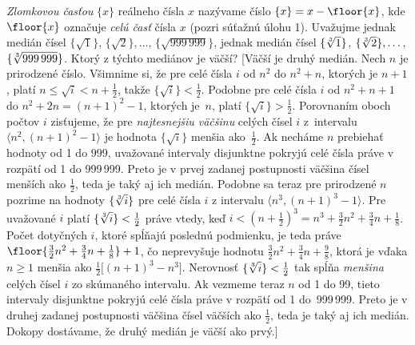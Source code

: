 {\leavevmode\emph{Zlomkovou časťou} $\{x\}$ reálneho čísla $x$ nazývame
číslo $\{x\} = x - \floor{x}$, kde $\floor{x}$ označuje {\it celú
časť\/} čísla $x$ (pozri súťažnú úlohu 1). Uvažujme jednak medián
čísel $\{\sqrt{1}\}$, $\{\sqrt{2}\}, \dots$, $\{\sqrt{999\,999}\}$,
jednak medián čísel $\{\root3\of{1}\}$, $\{\root3\of{2}\}, \dots$,
$\{\root3\of{999\,999}\}$. Ktorý z týchto mediánov je väčší?
[Väčší je druhý medián. Nech $n$ je prirodzené číslo. Všimnime si,
že pre celé čísla $i$ od $n^2$ do $n^2+n$, ktorých je $n+1$, platí
$n\leq\sqrt{i}<n+\frac12$, takže $\{\sqrt{i}\}<\frac12$.
Podobne pre celé čísla $i$ od $n^2+n+1$ do $n^2+2n=(n+1)^2-1$, ktorých
je~$n$, platí $\{\sqrt{i}\}>\frac12$. Porovnaním oboch počtov $i$
zisťujeme, že pre {\it najtesnejšiu väčšinu} celých čísel
$i$ z~intervalu $\langle n^2, (n+1)^2-1 \rangle$ je
hodnota $\{\sqrt{i}\}$ menšia ako~$\frac12$. Ak necháme $n$
prebiehať hodnoty od 1 do 999, uvažované intervaly disjunktne
pokryjú celé čísla práve v rozpätí od 1 do 999\,999.
Preto je v prvej zadanej postupnosti väčšina čísel
menších ako $\frac12$, teda je taký aj ich medián. Podobne
sa teraz pre prirodzené $n$ pozrime na hodnoty $\{\root3\of{i}\}$
pre celé čísla $i$ z intervalu $\langle n^3, (n+1)^3-1 \rangle$.
Pre uvažované $i$ platí $\{\root3\of{i}\}<\frac12$ práve vtedy, keď
$i<\left(n+\frac12\right)^3 = n^3 + \frac32n^2 + \frac34n +
\frac18$. Počet dotyčných $i$, ktoré spĺňajú poslednú podmienku,
je teda práve $\floor{\frac32n^2 + \frac34n + \frac18} + 1$, čo
neprevyšuje hodnotu $\frac32n^2+\frac34n+\frac98$, ktorá je vďaka $n\geq1$
menšia ako {$\frac12\bigl[(n+1)^3-n^3\bigr]$}.
Nerovnosť $\{\root3\of{i}\}<\frac12$ tak spĺňa {\it menšina\/}
celých čísel $i$ zo skúmaného intervalu. Ak vezmeme teraz
$n$ od 1 do 99, tieto intervaly disjunktne pokryjú celé čísla
práve v rozpätí od 1 do~999\,999. Preto je v druhej zadanej postupnosti
väčšina čísel väčších ako $\frac12$, teda je taký aj ich medián.
Dokopy dostávame, že druhý medián je väčší ako prvý.]

}

